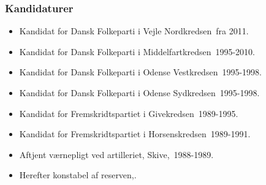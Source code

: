 \documentclass[11pt, a4paper]{awesome-cv}
\begin{document}
\begin{cvletter}
\subsubsection*{Kandidaturer}
\begin{itemize}
\item Kandidat for Dansk Folkeparti i Vejle Nordkredsen fra 2011.
\item Kandidat for Dansk Folkeparti i Middelfartkredsen 1995-2010.
\item Kandidat for Dansk Folkeparti i Odense Vestkredsen 1995-1998.
\item Kandidat for Dansk Folkeparti i Odense Sydkredsen 1995-1998.
\item Kandidat for Fremskridtspartiet i Givekredsen 1989-1995.
\item Kandidat for Fremskridtspartiet i Horsenskredsen 1989-1991.
\end{itemize}
\begin{itemize}
\item Aftjent værnepligt ved artilleriet, Skive, 1988-1989.
\item Herefter konstabel af reserven,.
\end{itemize}
\end{cvletter}
\end{document}
